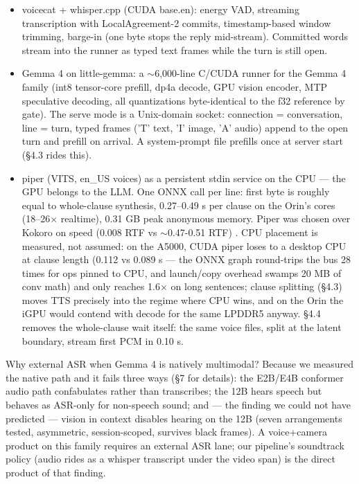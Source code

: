 \documentclass[journal]{IEEEtran}
\begin{document}
    \begin{itemize}
        \item voicecat + whisper.cpp (CUDA base.en): energy VAD, streaming transcription with LocalAgreement-2 commits, timestamp-based window trimming, barge-in (one byte stops the reply mid-stream). Committed words stream into the runner as typed text frames while the turn is still open.
        \item Gemma 4 on little-gemma: a $\sim$6,000-line C/CUDA runner for the Gemma 4 family (int8 tensor-core prefill, dp4a decode, GPU vision encoder, MTP speculative decoding, all quantizations byte-identical to the f32 reference by gate). The serve mode is a Unix-domain socket: connection = conversation, line = turn, typed frames ('T' text, 'I' image, 'A' audio) append to the open turn and prefill on arrival. A system-prompt file prefills once at server start (§4.3 rides this).
        \item piper (VITS, en\_US voices) as a persistent stdin service on the CPU — the GPU belongs to the LLM. One ONNX call per line: first byte is roughly equal to whole-clause synthesis, 0.27–0.49 s per clause on the Orin's cores (18–26× realtime), 0.31 GB peak anonymous memory. Piper was chosen over Kokoro on speed (0.008 RTF vs $\sim$0.47-0.51 RTF) \cite{codesotatts}. CPU placement is measured, not assumed: on the A5000, CUDA piper loses to a desktop CPU at clause length (0.112 vs 0.089 s — the ONNX graph round-trips the bus 28 times for ops pinned to CPU, and launch/copy overhead swamps 20 MB of conv math) and only reaches 1.6× on long sentences; clause splitting (§4.3) moves TTS precisely into the regime where CPU wins, and on the Orin the iGPU would contend with decode for the same LPDDR5 anyway. §4.4 removes the whole-clause wait itself: the same voice files, split at the latent boundary, stream first PCM in 0.10 s.
    \end{itemize}

Why external ASR when Gemma 4 is natively multimodal? Because we measured the native path and it fails three ways (§7 for details): the E2B/E4B conformer audio path confabulates rather than transcribes; the 12B hears speech but behaves as ASR-only for non-speech sound; and — the finding we could not have predicted — vision in context disables hearing on the 12B (seven arrangements tested, asymmetric, session-scoped, survives black frames). A voice+camera product on this family requires an external ASR lane; our pipeline's soundtrack policy (audio rides as a whisper transcript under the video span) is the direct product of that finding.
\end{document}
